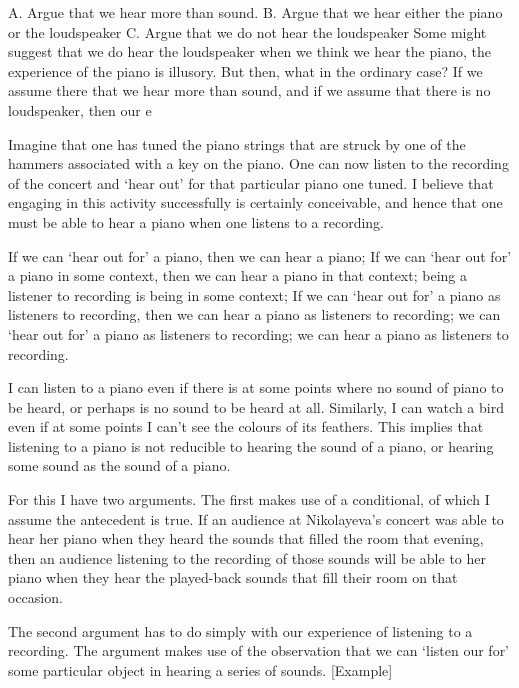 \documentclass[sloppy, journal, git, bytitle, dodraft]{humapap}
\begin{document}
A. Argue that we hear more than sound.
B. Argue that we hear either the piano or the loudspeaker
C. Argue that we do not hear the loudspeaker
Some might suggest that we do hear the loudspeaker when we think we hear the piano, the experience of the piano is illusory. But then, what in the ordinary case? If we assume there that we hear more than sound, and if we assume that there is no loudspeaker, then our e


Imagine that one has tuned the piano strings that are struck by one of the hammers associated with a key on the piano. One can now listen to the recording of the concert and `hear out' for that particular piano one tuned. I believe that engaging in this activity successfully is certainly conceivable, and hence that one must be able to hear a piano when one listens to a recording. 
 
If we can `hear out for' a piano, then we can hear a piano; If we can `hear out for' a piano in some context, then we can hear a piano in that context; being a listener to recording is being in some context; If we can `hear out for' a piano as listeners to recording, then we can hear a piano as listeners to recording; we can `hear out for' a piano as listeners to recording; we can hear a piano as listeners to recording.

I can listen to a piano even if there is at some points where no sound of piano to be heard, or perhaps is no sound to be heard at all. Similarly, I can watch a bird even if at some points I can't see the colours of its feathers. This implies that listening to a piano is not reducible to hearing the sound of a piano, or hearing some sound as the sound of a piano. 



For this I have two arguments. The first makes use of a conditional, of which I assume the antecedent is true. If an audience at Nikolayeva's concert was able to hear her piano when they heard the sounds that filled the room that evening, then an audience listening to the recording of those sounds will be able to her piano when they hear the played-back sounds that fill their room on that occasion. %



The second argument has to do simply with our experience of listening to a recording. The argument makes use of the observation that we can `listen our for' some particular object in hearing a series of sounds. [Example]
\end{document}
